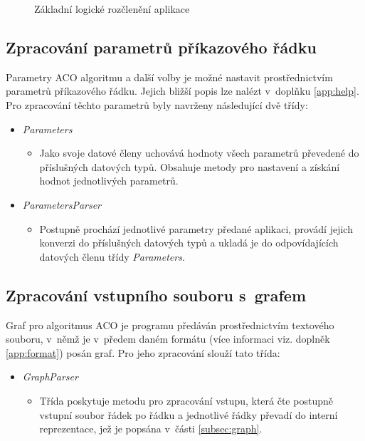 \documentclass[a4paper, 12pt]{article}
\begin{document}
\begin{figure}[b]
  \begin{center}
    
  \end{center}
\caption{Základní logické rozčlenění aplikace}
\label{img:logika}
\end{figure}


\subsection{Zpracování parametrů příkazového řádku}
\label{subsec:process}
Parametry ACO algoritmu a další volby je možné nastavit prostřednictvím parametrů příkazového řádku. Jejich bližší popis lze nalézt v~doplňku \ref{app:help}.
Pro zpracování těchto parametrů byly navrženy následující dvě třídy:
\begin{itemize}
  \item \emph{Parameters}
  \begin{itemize}
    \item[] Jako svoje datové členy uchovává hodnoty všech parametrů převedené do příslušných datových typů.
    Obsahuje metody pro nastavení a získání hodnot jednotlivých parametrů.
  \end{itemize}
  \item \emph{ParametersParser}
  \begin{itemize}
    \item[] Postupně prochází jednotlivé parametry předané aplikaci, provádí jejich konverzi do příslušných datových typů a ukladá je do odpovídajících
    datových členu třídy \emph{Parameters}.
  \end{itemize}
\end{itemize}

\subsection{Zpracování vstupního souboru s~grafem}
Graf pro algoritmus ACO je programu předáván prostřednictvím textového souboru, v~němž je v~předem daném formátu (více informaci viz. doplněk \ref{app:format})
posán graf. Pro jeho zpracování slouží tato třída:
\begin{itemize}
  \item \emph{GraphParser}
  \begin{itemize}
    \item[] Třída poskytuje metodu pro zpracování vstupu, která čte postupně vstupní soubor řádek po řádku a jednotlivé řádky převadí do interní reprezentace,
    jež je popsána v~části \ref{subsec:graph}.
  \end{itemize}
\end{itemize}
\end{document}

